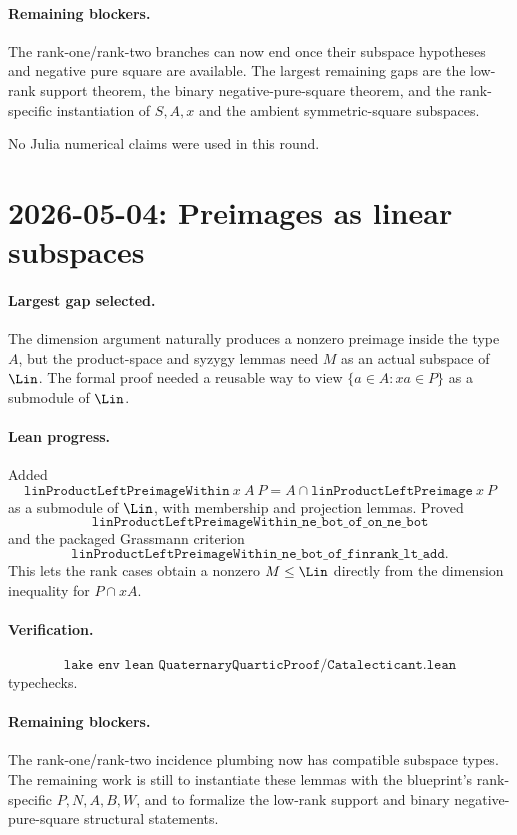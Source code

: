 \documentclass[11pt]{article}
\begin{document}
\paragraph{Remaining blockers.}
The rank-one/rank-two branches can now end once their subspace hypotheses and
negative pure square are available.  The largest remaining gaps are the
low-rank support theorem, the binary negative-pure-square theorem, and the
rank-specific instantiation of \(S,A,x\) and the ambient symmetric-square
subspaces.

No Julia numerical claims were used in this round.

\section*{2026-05-04: Preimages as linear subspaces}

\paragraph{Largest gap selected.}
The dimension argument naturally produces a nonzero preimage inside the type
\(A\), but the product-space and syzygy lemmas need \(M\) as an actual
subspace of \(\Lin\).  The formal proof needed a reusable way to view
\(\{a\in A:xa\in P\}\) as a submodule of \(\Lin\).

\paragraph{Lean progress.}
Added
\[
\texttt{linProductLeftPreimageWithin}\ x\ A\ P
  = A\cap\texttt{linProductLeftPreimage}\ x\ P
\]
as a submodule of \(\Lin\), with membership and projection lemmas.  Proved
\[
\texttt{linProductLeftPreimageWithin\_ne\_bot\_of\_on\_ne\_bot}
\]
and the packaged Grassmann criterion
\[
\texttt{linProductLeftPreimageWithin\_ne\_bot\_of\_finrank\_lt\_add}.
\]
This lets the rank cases obtain a nonzero \(M\le\Lin\) directly from the
dimension inequality for \(P\cap xA\).

\paragraph{Verification.}
\[
\texttt{lake env lean QuaternaryQuarticProof/Catalecticant.lean}
\]
typechecks.

\paragraph{Remaining blockers.}
The rank-one/rank-two incidence plumbing now has compatible subspace types.
The remaining work is still to instantiate these lemmas with the blueprint's
rank-specific \(P,N,A,B,W\), and to formalize the low-rank support and binary
negative-pure-square structural statements.
\end{document}
